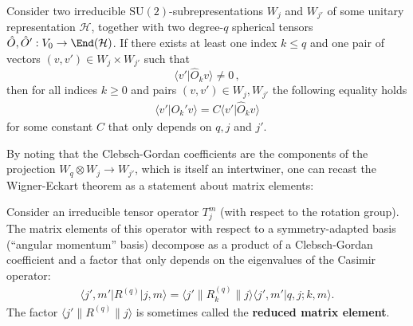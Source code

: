     \begin{theorem}
        Consider two irreducible $\mathrm{SU}(2)$-subrepresentations $W_j$ and $W_{j'}$ of some unitary representation $\mathcal{H}$, together with two degree-$q$ spherical tensors $\hat{O},\hat{O}':V_0\rightarrow\End(\mathcal{H})$. If there exists at least one index $k\leq q$ and one pair of vectors $(v,v')\in W_j\times W_{j'}$ such that \[\langle v'\vert\hat{O}_kv \rangle\neq0\,,\] then for all indices $k\geq 0$ and pairs $(v,v')\in W_j,W_{j'}$ the following equality holds
        \begin{gather}
            \langle v'\vert\hat{O}_k'v \rangle = C\langle v'\vert\hat{O}_kv \rangle
        \end{gather}
        for some constant $C$ that only depends on $q,j$ and $j'$.
    \end{theorem}
    By noting that the Clebsch-Gordan coefficients are the components of the projection $W_q\otimes W_j\rightarrow W_{j'}$, which is itself an intertwiner, one can recast the Wigner-Eckart theorem as a statement about matrix elements:
    \begin{result}
        Consider an irreducible tensor operator $T_j^m$ (with respect to the rotation group). The matrix elements of this operator with respect to a symmetry-adapted basis (``angular momentum'' basis) decompose as a product of a Clebsch-Gordan coefficient and a factor that only depends on the eigenvalues of the Casimir operator:
        \begin{gather}
            \langle j',m'\vert R^{(q)}\vert j,m \rangle = \langle j'\|R_k^{(q)}\|j \rangle\langle j',m'\vert q,j;k,m \rangle.
        \end{gather}
        The factor $\langle j'\|R^{(q)}\|j \rangle$ is sometimes called the \textbf{reduced matrix element}.
    \end{result}